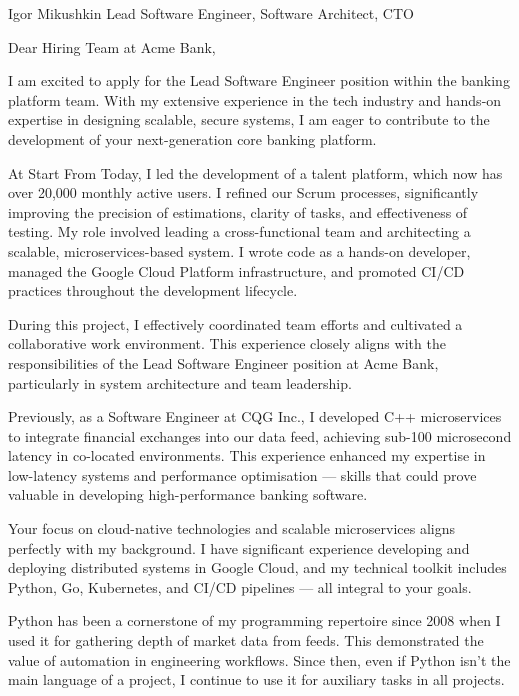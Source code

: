 \begin{paracol}{2}
\cvHeader
    {Igor Mikushkin}
    {}
    {Lead Software Engineer, Software Architect, CTO}

\setlength{\parskip}{0.7em}

Dear Hiring Team at Acme Bank,

I am excited to apply for the Lead Software Engineer position
within the banking platform team.
With my extensive experience in the tech industry
and hands-on expertise in designing scalable, secure systems,
I am eager to contribute to the development
of your next-generation core banking platform.

At Start From Today, I led the development of a talent platform,
which now has over 20,000 monthly active users.
I refined our Scrum processes, significantly improving the precision of estimations,
clarity of tasks, and effectiveness of testing.
My role involved leading a cross-functional team
and architecting a scalable, microservices-based system.
I wrote code as a hands-on developer,
managed the Google Cloud Platform infrastructure,
and promoted CI/CD practices throughout the development lifecycle.

During this project, I effectively coordinated team efforts
and cultivated a collaborative work environment.
This experience closely aligns with the responsibilities
of the Lead Software Engineer position at Acme Bank,
particularly in system architecture and team leadership.

Previously, as a Software Engineer at CQG Inc.,
I developed C++ microservices to integrate financial exchanges into our data feed,
achieving sub-100 microsecond latency in co-located environments.
This experience enhanced my expertise
in low-latency systems and performance optimisation
--- skills that could prove valuable in developing high-performance banking software.

Your focus on cloud-native technologies
and scalable microservices aligns perfectly with my background.
I have significant experience developing
and deploying distributed systems in Google Cloud,
and my technical toolkit includes Python, Go, Kubernetes, and CI/CD pipelines
--- all integral to your goals.

Python has been a cornerstone of my programming repertoire since 2008
when I used it for gathering depth of market data from feeds.
This demonstrated the value of automation in engineering workflows.
Since then, even if Python isn't the main language of a project,
I continue to use it for auxiliary tasks in all projects.


\end{paracol}
